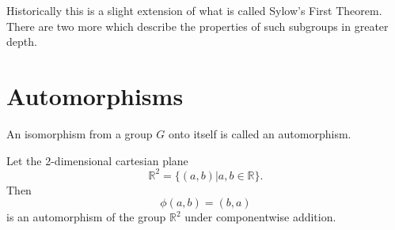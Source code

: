 Historically this is a slight extension of what is called Sylow's First Theorem. There are
 two more which describe the properties of such subgroups in greater depth.

 \section{Automorphisms}

 \begin{definition}[Automorphisms]
     An isomorphism from a group $G$ onto itself is called an automorphism.
 \end{definition}
 
 \begin{example}
     Let the 2-dimensional cartesian plane
     \[
         \mathbb{R}^2 = \{ (a,b) | a, b \in \mathbb{R} \}.
     \]
     Then
     \[
         \phi(a,b) = (b,a)
     \]
     is an automorphism of the group $\mathbb{R}^2$ under componentwise addition.
 \end{example}
 
